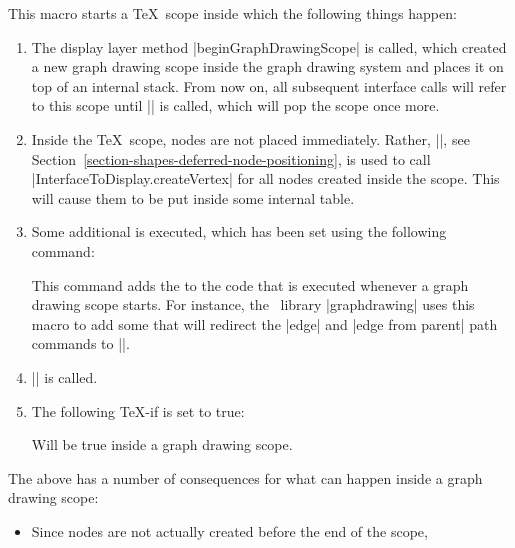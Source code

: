\begin{command}{\pgfgdbeginscope}
    This macro starts a \TeX\ scope inside which the following things happen:
    \begin{enumerate}
        \item The display layer method |beginGraphDrawingScope| is called,
            which created a new graph drawing scope inside the graph drawing
            system and places it on top of an internal stack. From now on, all
            subsequent interface calls will refer to this scope until
            |\pgfgdendscope| is called, which will pop the scope once more.
        \item Inside the \TeX\ scope, nodes are not placed immediately. Rather,
            |\pgfpositionnodelater|, see
            Section~\ref{section-shapes-deferred-node-positioning}, is used to
            call |InterfaceToDisplay.createVertex| for all nodes created inside
            the scope. This will cause them to be put inside some internal
            table.
        \item Some additional  is executed, which has been set using
            the following command:
            \begin{command}{\pgfgdaddspecificationhook{}}
                This command adds the  to the code that is executed
                whenever a graph drawing scope starts. For instance, the
                \tikzname\ library |graphdrawing| uses this macro to add some
                 that will redirect the |edge| and
                |edge from parent| path commands to |\pgfgdedge|.
            \end{command}
        \item |\pgftransformreset| is called.
        \item The following \TeX-if is set to true:
            {
                \let\ifpgfgdgraphdrawingscopeactive=\relax
                \begin{textoken}{\ifpgfgdgraphdrawingscopeactive}
                    Will be true inside a graph drawing scope.
                \end{textoken}
            }
    \end{enumerate}
    The above has a number of consequences for what can happen inside a graph
    drawing scope:
    \begin{itemize}
        \item Since nodes are not actually created before the end of the scope,

\end{itemize}
\end{command}
